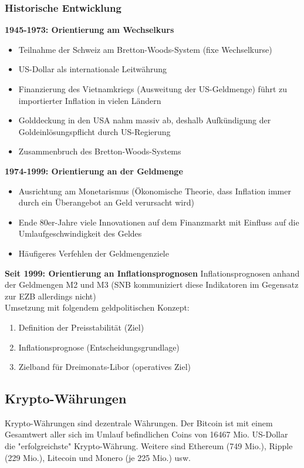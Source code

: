 \subsubsection{Historische Entwicklung}
\textbf{1945-1973: Orientierung am Wechselkurs}\\
\begin{itemize}
	\item Teilnahme der Schweiz am Bretton-Woods-System (fixe Wechselkurse)
	\item US-Dollar als internationale Leitwährung
	\item Finanzierung des Vietnamkriegs (Ausweitung der US-Geldmenge) führt zu importierter Inflation in vielen Ländern
	\item Golddeckung in den USA nahm massiv ab, deshalb Aufkündigung der Goldeinlösungspflicht durch US-Regierung
	\item Zusammenbruch des Bretton-Woods-Systems
\end{itemize}
\vspace{\baselineskip}
\textbf{1974-1999: Orientierung an der Geldmenge}
\begin{itemize}
	\item Ausrichtung am Monetarismus (Ökonomische Theorie, dass Inflation immer durch ein Überangebot an Geld verursacht wird)
	\item Ende 80er-Jahre viele Innovationen auf dem Finanzmarkt mit Einfluss auf die Umlaufgeschwindigkeit des Geldes
	\item Häufigeres Verfehlen der Geldmengenziele
\end{itemize}
\vspace{\baselineskip}
\textbf{Seit 1999: Orientierung an Inflationsprognosen}
Inflationsprognosen anhand der Geldmengen M2 und M3 (SNB kommuniziert diese Indikatoren im Gegensatz zur EZB allerdings nicht)\\
Umsetzung mit folgendem geldpolitischen Konzept:
\begin{enumerate}
	\item Definition der Preisstabilität (Ziel)
	\item Inflationsprognose (Entscheidungsgrundlage)
	\item Zielband für Dreimonats-Libor (operatives Ziel)
\end{enumerate}

\subsection{Krypto-Währungen}
Krypto-Währungen sind dezentrale Währungen. Der Bitcoin ist mit einem Gesamtwert aller sich im Umlauf befindlichen Coins von 16467 Mio. US-Dollar die "erfolgreichste" Krypto-Währung. Weitere sind Ethereum (749 Mio.), Ripple (229 Mio.), Litecoin und Monero (je 225 Mio.) usw.

